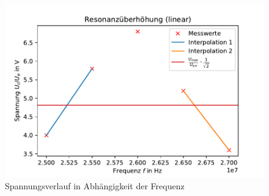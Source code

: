   \begin{figure}
    \centering
    \includegraphics{resonanzuberhohung.pdf}
    \caption{Spannungsverlauf in Abhängigkeit der Frequenz}
    \label{fig:resonanzzoom}
  \end{figure}

